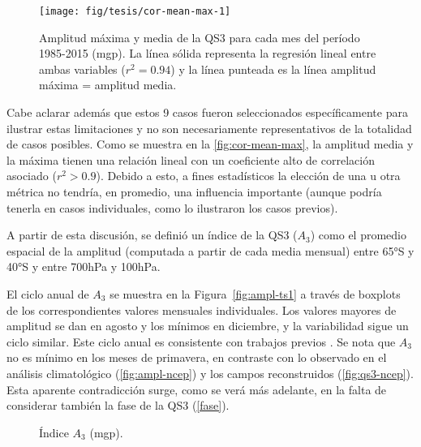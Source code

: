 \documentclass[spanish,a4paper,12pt,oneside]{book}
\begin{document}
\begin{figure}
\texttt{[image: fig/tesis/cor-mean-max-1]} \caption{Amplitud máxima y media de la QS3 para cada mes del período 1985-2015 (mgp). La línea sólida representa la regresión lineal entre ambas variables ($r^2 = 0.94 $) y la línea punteada es la línea amplitud máxima = amplitud media.}\label{fig:cor-mean-max}
\end{figure}

Cabe aclarar además que estos 9 casos fueron seleccionados
específicamente para ilustrar estas limitaciones y no son necesariamente
representativos de la totalidad de casos posibles. Como se muestra en la
\autoref{fig:cor-mean-max}, la amplitud media y la máxima tienen una
relación lineal con un coeficiente alto de correlación asociado
(\(r^2>0.9\)). Debido a esto, a fines estadísticos la elección de una u
otra métrica no tendría, en promedio, una influencia importante (aunque
podría tenerla en casos individuales, como lo ilustraron los casos
previos).

A partir de esta discusión, se definió un índice de la QS3 (\(A_3\))
como el promedio espacial de la amplitud (computada a partir de cada
media mensual) entre 65°S y 40°S y entre 700hPa y 100hPa.

El ciclo anual de \(A_3\) se muestra en la Figura~\ref{fig:ampl-ts1} a
través de boxplots de los correspondientes valores mensuales
individuales. Los valores mayores de amplitud se dan en agosto y los
mínimos en diciembre, y la variabilidad sigue un ciclo similar. Este
ciclo anual es consistente con trabajos previos
\citep{Loon1972, Karoly1985, Raphael2004}. Se nota que \(A_3\) no es
mínimo en los meses de primavera, en contraste con lo observado en el
análisis climatológico (\autoref{fig:ampl-ncep}) y los campos
reconstruidos (\autoref{fig:qs3-ncep}). Esta aparente contradicción
surge, como se verá más adelante, en la falta de considerar también la
fase de la QS3 (\autoref{fase}).

\begin{figure}
\newline{}\caption{Índice $A_3$ (mgp).}\label{fig:ampl-ts}
\end{figure}
\end{document}

